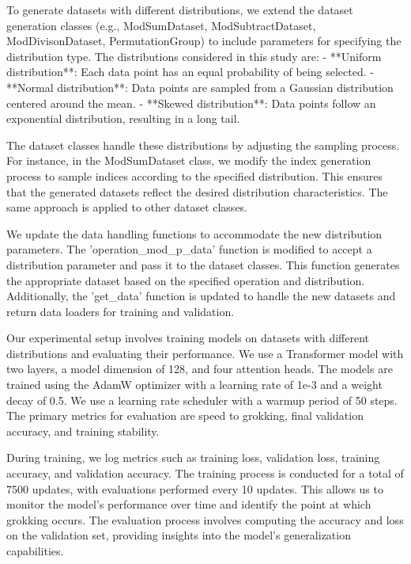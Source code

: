 \documentclass{article} %
\begin{document}
To generate datasets with different distributions, we extend the dataset generation classes (e.g., ModSumDataset, ModSubtractDataset, ModDivisonDataset, PermutationGroup) to include parameters for specifying the distribution type. The distributions considered in this study are:
- **Uniform distribution**: Each data point has an equal probability of being selected.
- **Normal distribution**: Data points are sampled from a Gaussian distribution centered around the mean.
- **Skewed distribution**: Data points follow an exponential distribution, resulting in a long tail.

The dataset classes handle these distributions by adjusting the sampling process. For instance, in the ModSumDataset class, we modify the index generation process to sample indices according to the specified distribution. This ensures that the generated datasets reflect the desired distribution characteristics. The same approach is applied to other dataset classes.

We update the data handling functions to accommodate the new distribution parameters. The 'operation_mod_p_data' function is modified to accept a distribution parameter and pass it to the dataset classes. This function generates the appropriate dataset based on the specified operation and distribution. Additionally, the 'get_data' function is updated to handle the new datasets and return data loaders for training and validation.

Our experimental setup involves training models on datasets with different distributions and evaluating their performance. We use a Transformer model \cite{vaswani2017attention} with two layers, a model dimension of 128, and four attention heads. The models are trained using the AdamW optimizer \cite{loshchilov2017adamw} with a learning rate of 1e-3 and a weight decay of 0.5. We use a learning rate scheduler with a warmup period of 50 steps. The primary metrics for evaluation are speed to grokking, final validation accuracy, and training stability.

During training, we log metrics such as training loss, validation loss, training accuracy, and validation accuracy. The training process is conducted for a total of 7500 updates, with evaluations performed every 10 updates. This allows us to monitor the model's performance over time and identify the point at which grokking occurs. The evaluation process involves computing the accuracy and loss on the validation set, providing insights into the model's generalization capabilities.
\end{document}
